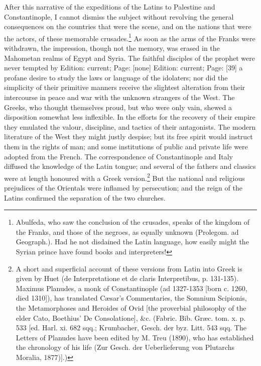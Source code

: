 After this narrative of the expeditions of the Latins to Palestine and Constantinople, I cannot dismiss the subject without revolving the general consequences on the countries that were the scene, and on the nations that were the actors, of these memorable crusades.\footnote{Abulfeda, who saw the conclusion of the crusades, speaks of the kingdom of the Franks, and those of the negroes, as equally unknown (Prolegom. ad Geograph.). Had he not disdained the Latin language, how easily might the Syrian prince have found books and interpreters!} As soon as the arms of the Franks were withdrawn, the impression, though not the memory, was erased in the Mahometan realms of Egypt and Syria. The faithful disciples of the prophet were never tempted by Edition: current; Page: [none] Edition: current; Page: [39] a profane desire to study the laws or language of the idolaters; nor did the simplicity of their primitive manners receive the slightest alteration from their intercourse in peace and war with the unknown strangers of the West. The Greeks, who thought themselves proud, but who were only vain, shewed a disposition somewhat less inflexible. In the efforts for the recovery of their empire they emulated the valour, discipline, and tactics of their antagonists. The modern literature of the West they might justly despise; but its free spirit would instruct them in the rights of man; and some institutions of public and private life were adopted from the French. The correspondence of Constantinople and Italy diffused the knowledge of the Latin tongue; and several of the fathers and classics were at length honoured with a Greek version.\footnote{A short and superficial account of these versions from Latin into Greek is given by Huet (de Interpretatione et de claris Interpretibus, p. 131-135). Maximus Planudes, a monk of Constantinople (ad 1327-1353 [born c. 1260, died 1310]), has translated Cæsar\texthebrew{}’s Commentaries, the Somnium Scipionis, the Metamorphoses and Heroides of Ovid [the proverbial philosophy of the elder Cato, Boethius\texthebrew{}’ De Consolatione], \&c. (Fabric. Bib. Græc. tom. x. p. 533 [ed. Harl. xi. 682 sqq.; Krumbacher, Gesch. der byz. Litt. 543 sqq. The Letters of Planudes have been edited by M. Treu (1890), who has established the chronology of his life (Zur Gesch. der Ueberlieferung von Plutarchs Moralia, 1877)].)} But the national and religious prejudices of the Orientals were inflamed by persecution; and the reign of the Latins confirmed the separation of the two churches.

